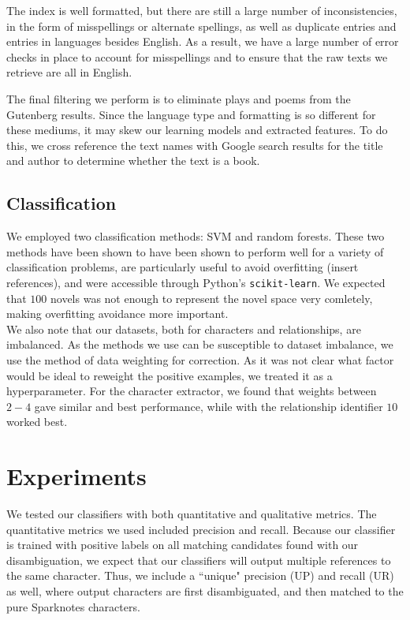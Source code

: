 \documentclass[12pt]{article}
\begin{document}
        The index is well formatted, but there are still a large number of inconsistencies, in the form of
        misspellings or alternate spellings, as well as duplicate entries and entries in languages besides
        English.  As a result, we have a large number of error checks in place to account for misspellings and
        to ensure that the raw texts we retrieve are all in English.

        The final filtering we perform is to eliminate plays and poems from the Gutenberg results.  Since the
        language type and formatting is so different for these mediums, it may skew our learning models and
        extracted features.  To do this, we cross reference the text names with Google search results for the
        title and author to determine whether the text is a book.

    \subsection{Classification}

        We employed two classification methods: SVM and random forests. These
        two methods have been shown to have been shown to perform well for a variety of
        classification problems, are particularly useful to avoid overfitting (insert references),
        and were accessible through Python's \texttt{scikit-learn}.
        We expected that $100$ novels was not enough to represent the novel space very comletely,
        making overfitting avoidance more important. \\

        We also note that our datasets, both for characters and relationships, are imbalanced.
        As the methods we use can be susceptible to dataset imbalance, we use the method of
        data weighting for correction. As it was not clear what factor would be ideal to 
        reweight the positive examples, we treated it as a hyperparameter. For the character
        extractor, we found that weights between $2-4$ gave similar and best performance,
        while with the relationship identifier $10$ worked best.

\section{Experiments}

    We tested our classifiers with both quantitative and qualitative metrics. The quantitative
    metrics we used included precision and recall. Because our classifier is trained with positive 
    labels on all matching candidates found with our disambiguation, we expect that our classifiers 
    will output multiple references to the same character. Thus, we include a ``unique" precision (UP) 
    and recall (UR) as well, where output characters are first disambiguated, and then matched to
    the pure Sparknotes characters. \\
    
\end{document}
